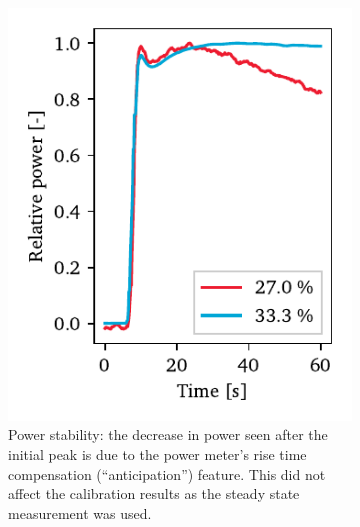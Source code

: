             \begin{figure}[h]
                \centering
                \begin{subfigure}[t]{2.5in}
                    \centering
                    \includegraphics[width=\textwidth]{assets/3 design/cw_power_time.pdf}
                    \caption{Power stability: the decrease in power seen after the initial peak is due to the power meter's rise time compensation (``anticipation'') feature. This did not affect the calibration results as the steady state measurement was used.}
                    \label{fig:cw_tests_time}
                \end{subfigure}
                \hfill
                \begin{subfigure}[t]{3.1in}
                    \centering

\end{subfigure}
\end{figure}
